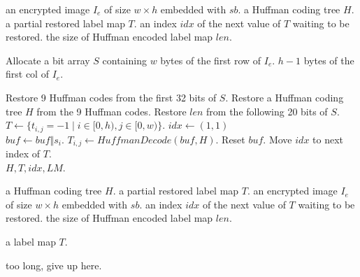 \begin{algorithm}
	\caption{Extract side information from reference bytes}
	\label{alg:msb:extsiref}
	
	\begin{algorithmic}[1]
		\Require an encrypted image $I_e$ of size $w \times h$ embedded with $sb$.
		\Ensure a Huffman coding tree $H$.
		\Ensure a partial restored label map $T$.
		\Ensure an index $idx$ of the next value of $T$ waiting to be restored.
		\Ensure the size of Huffman encoded label map $len$.
		
			\State Allocate a bit array $S$ containing
				\State\hspace{\algorithmicindent} $w$ bytes of the first row of $I_e$.
				\State\hspace{\algorithmicindent} $h - 1$ bytes of the first col of $I_e$.
				
			\State Restore 9 Huffman codes from the first 32 bits of $S$.
			\State Restore a Huffman coding tree $H$ from the 9 Huffman codes.
			\State Restore $len$ from the following 20 bits of $S$.
			\\
			\State $T \gets \{t_{i, j} = -1 \mid i \in [0, h), j \in [0, w)\}$.
			\State $idx \gets (1, 1)$
			\\
				\State $buf \gets buf \Vert s_i$.
					\State $T_{i, j} \gets HuffmanDecode(buf, H)$.
					\State Reset $buf$.
					\State Move $idx$ to next index of $T$.
				\EndIf
			\EndFor
			\\
			\State \Return $H, T, idx, LM$.
		
		\EndFunction
	\end{algorithmic}
\end{algorithm}

\begin{algorithm}
	\caption{Extract side information from main part}
	\label{alg:msb:extsimain}
	
	\begin{algorithmic}[1]
		\Require a Huffman coding tree $H$.
		\Require a partial restored label map $T$.
		\Require an encrypted image $I_e$ of size $w \times h$ embedded with $sb$.
		\Require an index $idx$ of the next value of $T$ waiting to be restored.
		\Require the size of Huffman encoded label map $len$.
		
		\Ensure a label map $T$.
		
		
		too long, give up here.
		
		\EndFunction
	\end{algorithmic}
\end{algorithm}











